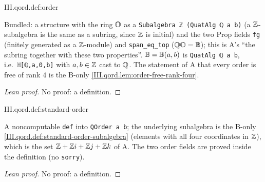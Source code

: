 \begin{definition}[orders]
\end{definition}
\begin{tfformal}{III.qord.def:order}
\begin{tffidelity}
Bundled: a structure with the ring $\mathbb{O}$ as a \texttt{Subalgebra ℤ (QuatAlg ℚ a b)} (a $\mathbb{Z}$-subalgebra is the same as a subring, since $\mathbb{Z}$ is initial) and the two Prop fields \texttt{fg} (finitely generated as a $\mathbb{Z}$-module) and \texttt{span\_eq\_top} ($\mathbb{Q}\mathbb{O}=\mathbb{B}$); this is A's ``the subring together with these two properties''. $\mathbb{B}=\mathbb{B}(a,b)$ is \texttt{QuatAlg ℚ a b}, i.e.\ \texttt{ℍ[ℚ,a,0,b]} with $a,b\in\mathbb{Z}$ cast to $\mathbb{Q}$. The statement of A that every order is free of rank $4$ is the B-only \cref{III.qord.lem:order-free-rank-four}.
\end{tffidelity}
\end{tfformal}
\begin{proof}[Lean proof]
No proof: a definition.
\end{proof}

\begin{definition}
\end{definition}
\begin{tfformal}{III.qord.def:standard-order}
\begin{tffidelity}
A noncomputable \texttt{def} into \texttt{QOrder a b}; the underlying subalgebra is the B-only \cref{III.qord.def:standard-order-subalgebra} (elements with all four coordinates in $\mathbb{Z}$), which is the set $\mathbb{Z}+\mathbb{Z} i+\mathbb{Z} j+\mathbb{Z} k$ of A. The two order fields are proved inside the definition (no \texttt{sorry}).
\end{tffidelity}
\end{tfformal}
\begin{proof}[Lean proof]
No proof: a definition.
\end{proof}

